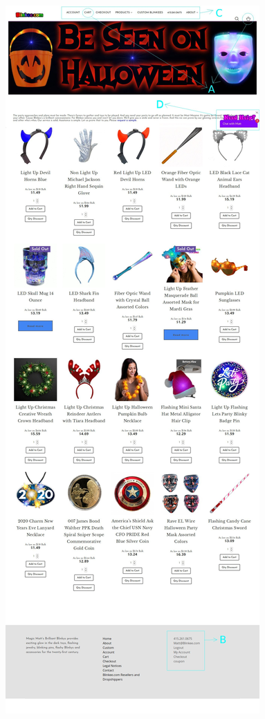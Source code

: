 \documentclass[a4paper,11pt,oneside]{scrreprt}
\begin{document}
\begin{figure}[H]
	\centering
	\includegraphics[clip, trim=0cm 109cm 0cm 0cm, scale=0.33]{./images/blinkee.jpg}

\end{figure}
\end{document}
